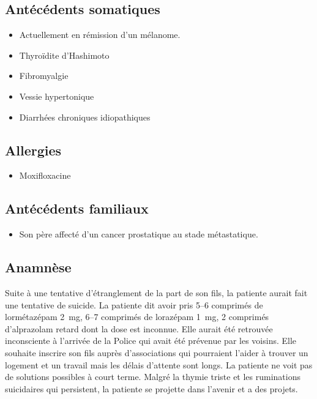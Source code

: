 \subsection{Antécédents somatiques}
\begin{itemize}[compact, label=\textbullet]
    \item Actuellement en rémission d’un mélanome.
    \item Thyroïdite d’Hashimoto  
    \item Fibromyalgie
    \item Vessie hypertonique
    \item Diarrhées chroniques idiopathiques
\end{itemize}

\subsection{Allergies}
\begin{itemize}[compact, label=\textbullet]
    \item Moxifloxacine 
\end{itemize}
 
\subsection{Antécédents familiaux}
\begin{itemize}[compact, label=\textbullet]
    \item Son père affecté d’un cancer prostatique au stade métastatique. 
\end{itemize}

\subsection{Anamnèse}  
Suite à une tentative d’étranglement de la part de son fils, la patiente aurait fait une tentative de suicide. La patiente dit avoir pris 5--6 comprimés de lormétazépam \qty{2}{\mg}, 6--7 comprimés de lorazépam \qty{1}{\mg}, 2 comprimés d'alprazolam retard dont la dose est inconnue. Elle aurait été retrouvée inconsciente à l’arrivée de la Police qui avait été prévenue par les voisins. Elle souhaite inscrire son fils auprès d’associations qui pourraient l’aider à trouver un logement et un travail mais les délais d’attente sont longs. La patiente ne voit pas de solutions possibles à court terme. Malgré la thymie triste et les ruminations suicidaires qui persistent, la patiente se projette dans l’avenir et a des projets. 

